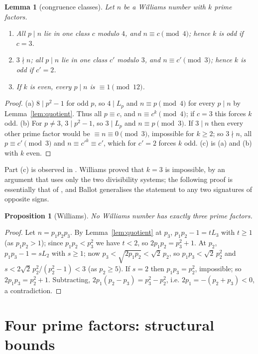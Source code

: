 \documentclass[11pt]{amsart}
\newtheorem{lemma}[theorem]{Lemma}
\newtheorem{proposition}[theorem]{Proposition}
\theoremstyle{definition}
\theoremstyle{remark}
\begin{document}
\begin{lemma}[congruence classes]\label{lem:classes}
Let $n$ be a Williams number with $k$ prime factors.
\begin{enumerate}[label=\textup{(\alph*)}]
\item All $p\mid n$ lie in one class $c$ modulo $4$, and $n\equiv c\pmod 4$; hence $k$ is odd if $c=3$.
\item $3\nmid n$; all $p\mid n$ lie in one class $c'$ modulo $3$, and $n\equiv c'\pmod3$; hence $k$ is odd if $c'=2$.
\item If $k$ is even, every $p\mid n$ is $\equiv1\pmod{12}$.
\end{enumerate}
\end{lemma}
\begin{proof}
(a) $8\mid p^2-1$ for odd $p$, so $4\mid L_p$ and $n\equiv p\pmod 4$ for every $p\mid n$ by Lemma~\ref{lem:quotient}. Thus all $p\equiv c$, and $n\equiv c^k\pmod4$; if $c=3$ this forces $k$ odd. (b) For $p\ne3$, $3\mid p^2-1$, so $3\mid L_p$ and $n\equiv p\pmod3$. If $3\mid n$ then every other prime factor would be $\equiv n\equiv0\pmod3$, impossible for $k\ge2$; so $3\nmid n$, all $p\equiv c'\pmod3$ and $n\equiv c'^k\equiv c'$, which for $c'=2$ forces $k$ odd. (c) is (a) and (b) with $k$ even.
\end{proof}

Part (c) is observed in \cite[\S2]{MD15}. Williams proved that $k=3$ is impossible, by an argument that uses only the two divisibility systems; the following proof is essentially that of \cite[Thm.~1]{MD15}, and Ballot \cite[Thm.~13]{Ballot26} generalises the statement to any two signatures of opposite signs.

\begin{proposition}[Williams]\label{prop:k3}
No Williams number has exactly three prime factors.
\end{proposition}
\begin{proof}
Let $n=p_1p_2p_3$. By Lemma~\ref{lem:quotient} at $p_3$, $p_1p_2-1=tL_3$ with $t\ge1$ (as $p_1p_2>1$); since $p_1p_2<p_3^2$ we have $t<2$, so $2p_1p_2=p_3^2+1$. At $p_2$, $p_1p_3-1=sL_2$ with $s\ge1$; now $p_3<\sqrt{2p_1p_2}<\sqrt2\,p_2$, so $p_1p_3<\sqrt2\,p_2^2$ and $s<2\sqrt2\,p_2^2/(p_2^2-1)<3$ (as $p_2\ge5$). If $s=2$ then $p_1p_3=p_2^2$, impossible; so $2p_1p_3=p_2^2+1$. Subtracting, $2p_1(p_2-p_3)=p_3^2-p_2^2$, i.e. $2p_1=-(p_2+p_3)<0$, a contradiction.
\end{proof}

\section{Four prime factors: structural bounds}\label{sec:k4}
\end{document}
